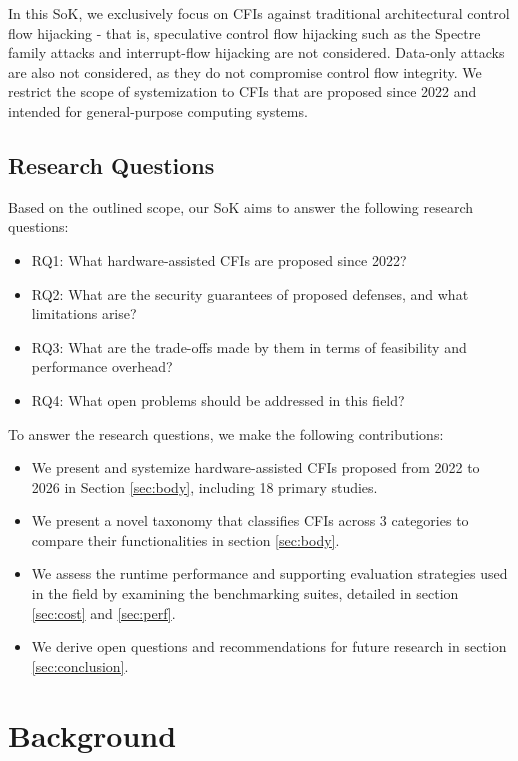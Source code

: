 \documentclass[journal,onecolumn]{IEEEtran}
\begin{document}
In this SoK, we exclusively focus on CFIs against  traditional architectural control flow hijacking - that is, speculative control flow hijacking such as the Spectre family attacks \cite{Kocher19} and interrupt-flow hijacking are not considered. Data-only attacks are also not considered, as they do not compromise control flow integrity. We restrict the scope of systemization to CFIs that are proposed since 2022 and intended for general-purpose computing systems.

\subsection{Research Questions}	

Based on the outlined scope, our SoK aims to answer the following research questions:

\begin{itemize}
    \item RQ1: What hardware-assisted CFIs are proposed since 2022?
    \item RQ2: What are the security guarantees of proposed defenses, and what limitations arise?
    \item RQ3: What are the trade-offs made by them in terms of feasibility and performance overhead?
    \item RQ4: What open problems should be addressed in this field?
\end{itemize}

To answer the research questions, we make the following contributions:

\begin{itemize}
	\item We present and systemize hardware-assisted CFIs proposed from 2022 to 2026 in Section \ref{sec:body}, including 18 primary studies.
	\item We present a novel taxonomy that classifies CFIs across 3 categories to compare their functionalities in section \ref{sec:body}.
	\item We assess the runtime performance and supporting evaluation strategies used in the field by examining the benchmarking suites, detailed in section \ref{sec:cost} and \ref{sec:perf}.
	\item We derive open questions and recommendations for future research in section \ref{sec:conclusion}.
\end{itemize}

\section{Background}
\end{document}
